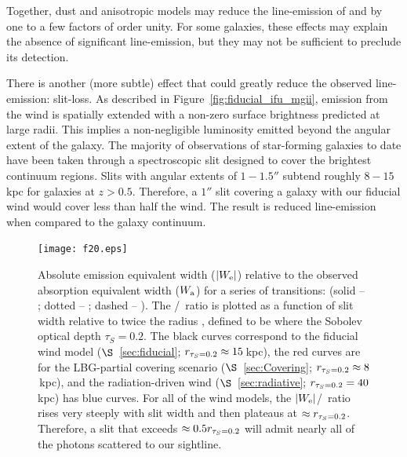 \documentclass[]{emulateapj}
\begin{document}
Together, dust and anisotropic models may reduce the line-emission
of  and 
by one to a few factors of order unity.  For some galaxies, these
effects may explain the absence of significant line-emission,
but they may not be sufficient to preclude its detection. 

There is another (more subtle) effect that could
greatly reduce the observed line-emission: slit-loss.  As
described in Figure~\ref{fig:fiducial_ifu_mgii}, 
emission from the wind is spatially extended with
a non-zero surface brightness predicted at large radii. This implies 
a non-negligible luminosity emitted beyond the angular extent of the galaxy.  
The majority of observations of star-forming galaxies to date have
been taken through a spectroscopic slit designed to cover
the brightest continuum regions. Slits with angular
extents of $1-1.5''$ subtend roughly $8-15$\,kpc for galaxies at $z>0.5$.
Therefore, a $1''$ slit covering a galaxy with our fiducial wind would cover
less than half the wind.  The result is reduced line-emission
when compared to the galaxy continuum.

\begin{figure}
\texttt{[image: f20.eps]}
\caption{
Absolute emission equivalent width ($|W_{\rm e}|$) relative to the observed
absorption equivalent width ($W_{\rm a}$) for a series of transitions:
(solid -- \mgiia; dotted -- \mgiib; dashed -- \feiib).  The
\ewe/\ewabs\ ratio is plotted as a function of slit width relative to
twice the radius \rtt, defined to be where the Sobolev optical depth 
$\tau_S = 0.2$.  The black curves correspond to the fiducial wind
model ($\S$~\ref{sec:fiducial}; $r_{\tau_S = 0.2} \approx 15$\,kpc), the red curves are for the
LBG-partial covering scenario ($\S$~\ref{sec:Covering}; $r_{\tau_S = 0.2} \approx
8$\,kpc), and the
radiation-driven wind ($\S$~\ref{sec:radiative}; $r_{\tau_S = 0.2} = 40$kpc) has blue curves.
For all of the wind models, the $|W_{\rm e}|$/\ewabs\ ratio rises very steeply
with slit width and then plateaus at $\approx r_{\tau_S = 0.2}$.  
Therefore, a slit that exceeds $\approx 0.5 r_{\tau_S = 0.2}$ will admit nearly
all of the photons scattered to our sightline.
}
\label{fig:obs_slit}
\end{figure}
\end{document}
